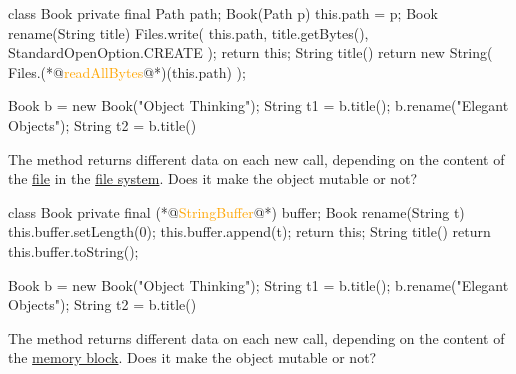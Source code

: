 \documentclass{article}
\begin{document}
\begin{pptWide}{2}
{\scriptsize\begin{ffcode}
class Book {
  private final Path path;
  Book(Path p) { this.path = p; }
  Book rename(String title) {
    Files.write(
      this.path,
      title.getBytes(),
      StandardOpenOption.CREATE
    );
    return this;
  }
  String title() {
    return new String(
      Files.(*@\textcolor{orange}{readAllBytes}@*)(this.path)
    );
  }
}
\end{ffcode}
}
\par\columnbreak\par
{\small\begin{ffcode}
Book b = new Book("Object Thinking");
String t1 = b.title();
b.rename("Elegant Objects");
String t2 = b.title()
\end{ffcode}
}
\par
The  method returns different data on each new call,
depending on the content of the \ul{file} in the \ul{file system}.
Does it make the object mutable or not?
\end{pptWide}
\par
\plush{}

\begin{pptWide}{2}
{\small\begin{ffcode}
class Book {
  private final (*@\textcolor{orange}{StringBuffer}@*) buffer;
  Book rename(String t) {
    this.buffer.setLength(0);
    this.buffer.append(t);
    return this;
  }
  String title() {
    return this.buffer.toString();
  }
}
\end{ffcode}
}
\par\columnbreak\par
{\small\begin{ffcode}
Book b = new Book("Object Thinking");
String t1 = b.title();
b.rename("Elegant Objects");
String t2 = b.title()
\end{ffcode}
}
\par
The  method returns different data on each new call,
depending on the content of the \ul{memory block}.
Does it make the object mutable or not?
\end{pptWide}
\par
\plush{}

\end{document}

